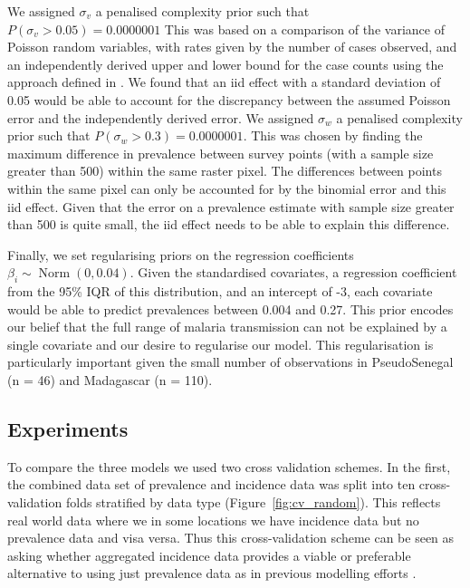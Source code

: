 \documentclass[10pt,letterpaper]{article}
\begin{document}
We assigned $\sigma_v$ a penalised complexity prior \cite{simpson2017penalising} such that $P(\sigma_v > 0.05) = 0.0000001$
This was based on a comparison of the variance of Poisson random variables, with rates given by the number of cases observed, and an independently derived upper and lower bound for the case counts using the approach defined in \cite{cibulskis2011worldwide}.
We found that an iid effect with a standard deviation of 0.05 would be able to account for the discrepancy between the assumed Poisson error and the independently derived error.
We assigned $\sigma_w$ a penalised complexity prior such that $P(\sigma_w > 0.3) = 0.0000001$. 
This was chosen by finding the maximum difference in prevalence between survey points (with a sample size greater than 500) within the same raster pixel.
The differences between points within the same pixel can only be accounted for by the binomial error and this iid effect.
Given that the error on a prevalence estimate with sample size greater than 500 is quite small, the iid effect needs to be able to explain this difference.

Finally, we set regularising priors on the regression coefficients $\beta_i \sim \operatorname{Norm}(0, 0.04)$. 
Given the standardised covariates, a regression coefficient from the 95\% IQR of this distribution, and an intercept of -3, each covariate would be able to predict prevalences between 0.004 and 0.27. 
This prior encodes our belief that the full range of malaria transmission can not be explained by a single covariate and our desire to regularise our model.
This regularisation is particularly important given the small number of observations in PseudoSenegal (n = 46) and Madagascar (n = 110).



\subsection*{Experiments}

To compare the three models we used two cross validation schemes. 
In the first, the combined data set of prevalence and incidence data was split into ten cross-validation folds stratified by data type (Figure~\ref{fig:cv_random}).
This reflects real world data where we in some locations we have incidence data but no prevalence data and visa versa.
Thus this cross-validation scheme can be seen as asking whether aggregated incidence data provides a viable or preferable alternative to using just prevalence data as in previous modelling efforts \cite{bhatt2015effect}.
\end{document}
